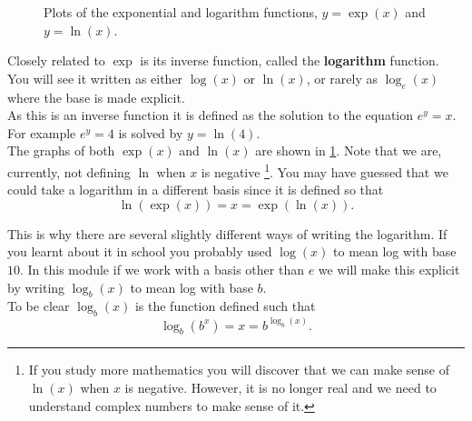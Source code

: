 \begin{figure}[ht]
    \centering
{}
    \caption{Plots of the exponential and logarithm functions, $y=\exp(x)$ and $y=\ln(x)$.}
        \label{fig: exp and log 2}
\end{figure}

Closely related to $\exp$ is its inverse function, called the \textbf{logarithm} function. You will see it written as either $\log(x)$ or $\ln(x)$, or rarely as $\log_{e}(x)$ where the base is made explicit. \\

As this is an inverse function it is defined as the solution to the equation $e^{y}=x$. For example $e^{y}=4$ is solved by $y=\ln(4)$.\\

The graphs of both $\exp(x)$ and $\ln(x)$ are shown in \cref{fig: exp and log 2}. Note that we are, currently, not defining $\ln$ when $x$ is negative \footnote{If you study more mathematics you will discover that we can make sense of $\ln(x)$ when $x$ is negative. However, it is no longer real and we need to understand complex numbers to make sense of it.}.  You may have guessed that we could take a logarithm in a different basis since it is defined so that
\begin{equation*}
\ln(\exp(x))=x=\exp(\ln(x)).
\end{equation*}

This is why there are several slightly different ways of writing the logarithm. If you learnt about it in school you probably used $\log(x)$ to mean log with base $10$. In this module if we work with a basis other than $e$ we will make this explicit by writing $\log_{b}(x)$ to mean log with base $b$.\\

To be clear $\log_{b}(x)$ is the function defined such that
\begin{equation*}
\log_{b}(b^{x})=x=b^{\log_{b}(x)}.
\end{equation*}

